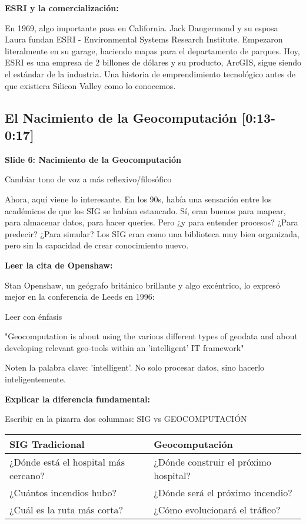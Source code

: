\documentclass[11pt,a4paper]{article}
\newcommand{\tiempo}[1]{\textcolor{timecolor}{\faIcon{clock} \textbf{[#1]}}}
\newcommand{\decir}[1]{\begin{tcolorbox}[colback=blue!5,colframe=usachblue,title={\faIcon{microphone} DECIR}]#1\end{tcolorbox}}
\newcommand{\hacer}[1]{\begin{tcolorbox}[colback=green!5,colframe=green!50!black,title={\faIcon{hand-point-right} HACER}]#1\end{tcolorbox}}
\begin{document}
\textbf{ESRI y la comercialización:}

\decir{En 1969, algo importante pasa en California. Jack Dangermond y su esposa Laura fundan ESRI - Environmental Systems Research Institute. Empezaron literalmente en su garage, haciendo mapas para el departamento de parques. Hoy, ESRI es una empresa de 2 billones de dólares y su producto, ArcGIS, sigue siendo el estándar de la industria. Una historia de emprendimiento tecnológico antes de que existiera Silicon Valley como lo conocemos.}

\subsection{El Nacimiento de la Geocomputación \tiempo{0:13-0:17}}

\textbf{Slide 6: Nacimiento de la Geocomputación}

\hacer{Cambiar tono de voz a más reflexivo/filosófico}

\decir{Ahora, aquí viene lo interesante. En los 90s, había una sensación entre los académicos de que los SIG se habían estancado. Sí, eran buenos para mapear, para almacenar datos, para hacer queries. Pero ¿y para entender procesos? ¿Para predecir? ¿Para simular? Los SIG eran como una biblioteca muy bien organizada, pero sin la capacidad de crear conocimiento nuevo.}

\textbf{Leer la cita de Openshaw:}

\decir{Stan Openshaw, un geógrafo británico brillante y algo excéntrico, lo expresó mejor en la conferencia de Leeds en 1996:}

\hacer{Leer con énfasis}

\decir{"Geocomputation is about using the various different types of geodata and about developing relevant geo-tools within an 'intelligent' IT framework"}

\decir{Noten la palabra clave: 'intelligent'. No solo procesar datos, sino hacerlo inteligentemente.}

\textbf{Explicar la diferencia fundamental:}

\hacer{Escribir en la pizarra dos columnas: SIG vs GEOCOMPUTACIÓN}

\begin{center}
\begin{tabular}{|l|l|}
\hline
\textbf{SIG Tradicional} & \textbf{Geocomputación} \\
\hline
¿Dónde está el hospital más cercano? & ¿Dónde construir el próximo hospital? \\
¿Cuántos incendios hubo? & ¿Dónde será el próximo incendio? \\
¿Cuál es la ruta más corta? & ¿Cómo evolucionará el tráfico? \\
\hline
\end{tabular}
\end{center}
\end{document}
